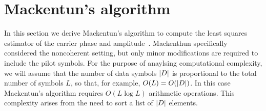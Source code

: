 \documentclass[journal]{IEEEtran}
\begin{document}

\section{Mackentun's algorithm}\label{sec:least-squar-estim}

In this section we derive Mackentun's algorithm to compute the least squares estimator of the carrier phase and amplitude~\cite{Mackenthun1994}.  Mackenthun specifically considered the noncoherent setting, but only minor modifications are required to include the pilot symbols.  For the purpose of anaylsing computational complexity, we will assume that the number of data symbols ${\left\vert D \right\vert}$ is proportional to the total number of symbols $L$, so that, for example, $O(L) = O({\left\vert D \right\vert})$.  In this case Mackentun's algorithm requires $O(L \log L)$ arithmetic operations.  This complexity arises from the need to sort a list of ${\left\vert D \right\vert}$ elements.  %
\end{document}
